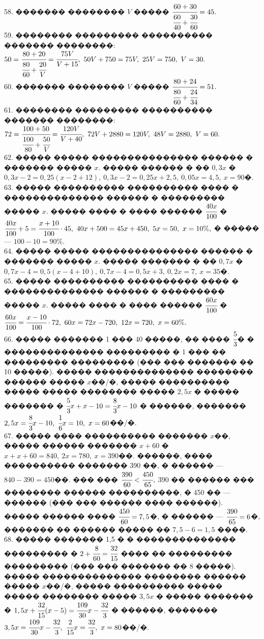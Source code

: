 \documentclass[12pt]{article}
\begin{document}
58. ������� �������� $V$ ����� $\cfrac{60+30}{\cfrac{60}{40}+\cfrac{30}{60}}=45.$\\
59. �������� ��������� ���������� ������� ��������: $50=\cfrac{80+20}{\cfrac{80}{60}+\cfrac{20}{V}}=\cfrac{75V}{V+15},\ 50V+750=75V,\ 25V=750,\ V=30.$\\
60. ������� �������� $V$ ����� $\cfrac{80+24}{\cfrac{80}{60}+\cfrac{24}{34}}=51.$\\
61. �������� ��������� ���������� ������� ��������: $72=\cfrac{100+50}{\cfrac{100}{80}+\cfrac{50}{V}}=\cfrac{120V}{V+40},\ 72V+2880=120V,\ 48V=2880,\ V=60.$\\
62. ����� ����� ��������������� ������ � ������� ����� $x.$ ����� ������ � �� $0,3x$ � $0,3x-2=0,25(x-2+12),\ 0,3x-2=0,25x+2,5,\ 0,05x=4,5,\ x=90$�.\\
63. ����� ���������� ���������� ���� � �������������� ������ � ��������� ����� $x.$ ����� ���� � ���� ������ $\cfrac{40x}{100}$ � $\cfrac{40x}{100}+5=\cfrac{x+10}{100}\cdot45,\ 40x+500=45x+450,\ 5x=50,\ x=10\%,$ � ����� --- $100-10=90\%.$\\
64. ����� ����� ��������������� ������ � ������� ����� $x.$ ����� ������� � �� $0,7x$ � $0,7x-4=0,5(x-4+10),\ 0,7x-4=0,5x+3,\ 0,2x=7,\ x=35$�.\\
65. ����� ���������� ���������� ���� � �������������� ������ � ��������� ����� $x.$ ����� ���� � ���� ������ $\cfrac{60x}{100}$ � $\cfrac{60x}{100}=\cfrac{x-10}{100}\cdot72,\ 60x=72x-720,\ 12x=720,\ x=60\%.$\\
66. ����� ������� 1 ��� 40 �����, �� ���� $\cfrac{5}{3}$� � �������������� ��������� � 1 ��� �� ��������� ��������� (��� ��� ������� �� 10 �����). ����� �������������� �������� ������ ����� $x$��/�, ����� ���������� ����� ����� �������� ����� $2,5x$ � ����� ������� �  $\cfrac{5}{3}x+x-10=\cfrac{8}{3}x-10$ � ������, ������� $2,5x=\cfrac{8}{3}x-10,\ \cfrac{1}{6}x=10,\ x=60$��/�.\\
67. ����� ���� ���������� ������� $x$��, ����� ������ ������� $x+60$ � $x+x+60=840,\ 2x=780,\ x=390$��. ������, ���� ���������� ������� 390 ��, � ������ --- $840-390=450$��. ��� ��� $\cfrac{390}{60}<\cfrac{450}{65},$ 390 �� ������ ��� �������� ������ ����������, � 450 �� --- ������ (��� ��� ������ ���� ������). ����� ������ ���� $\cfrac{450}{60}=7,5$�, � ������ --- $\cfrac{390}{65}=6$�, ������� �� ������ ����� �� $7,5-6=1,5$ ����.\\
68. ����� ������� 1,5 � � �������������� ��������� � $2+\cfrac{8}{60}=\cfrac{32}{15}$ ���� �� ��������� ��������� (��� ��� ������� �� 8 �����). ����� �������������� �������� ������ ����� $x$��/�, ����� ���������� ����� ����� �������� ����� $3,5x$ � ����� ������� �  $1,5x+\cfrac{32}{15}(x-5)=\cfrac{109}{30}x-\cfrac{32}{3}$ � ������, ������� $3,5x=\cfrac{109}{30}x-\cfrac{32}{3},\ \cfrac{2}{15}x=\cfrac{32}{3},\ x=80$��/�.\\
\end{document}
